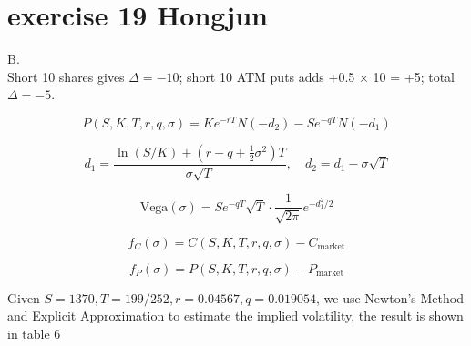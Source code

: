 \documentclass{article}
\begin{document}
\section{exercise 19 Hongjun}
B.\\
Short 10 shares gives $\Delta = −10$; short 10 ATM puts adds +0.5 × 10 = +5; total $\Delta = −5$.

\[
    P(S, K, T, r, q, \sigma) = K e^{-rT} N(-d_2) - S e^{-qT} N(-d_1)
\]

\[
    d_1 = \frac{\ln(S/K) + (r - q + \frac{1}{2}\sigma^2)T}{\sigma \sqrt{T}}, \quad
    d_2 = d_1 - \sigma \sqrt{T}
\]

\[
    \text{Vega}(\sigma) = S e^{-qT} \sqrt{T} \cdot \frac{1}{\sqrt{2\pi}} e^{-d_1^2 / 2}
\]

\[
    f_C(\sigma) = C(S, K, T, r, q, \sigma) - C_{\text{market}}
\]

\[
    f_P(\sigma) = P(S, K, T, r, q, \sigma) - P_{\text{market}}
\]

Given \(S=1370, T = 199/252, r=0.04567, q=0.019054 \),
we use Newton's Method and Explicit Approximation to estimate the implied volatility,
the result is shown in table 6
\end{document}
